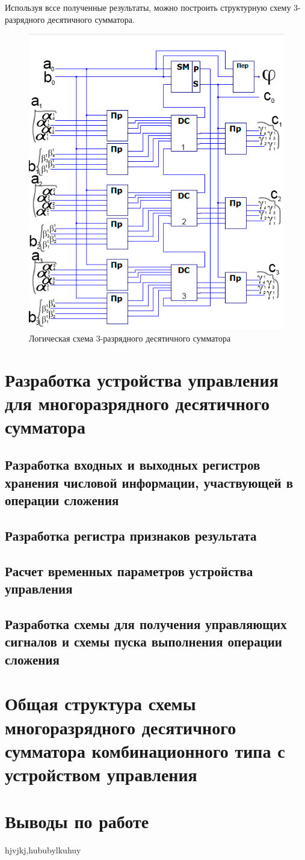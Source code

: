 \documentclass[a4paper,14pt]{article}
\begin{document}
Используя вссе полученные результаты, можно построить структурную схему 3-разрядного десятичного сумматора.

\begin{figure}[H]
	\centering
	\includegraphics[width=0.6\linewidth]{images/3razrSum}
	\caption{Логическая схема 3-разрядного десятичного сумматора}
	\label{fig:3razrSum}
\end{figure}



\section{Разработка устройства управления для многоразрядного десятичного сумматора}

\subsection{Разработка входных и выходных регистров хранения числовой информации, участвующей в операции сложения}

\subsection{Разработка регистра признаков результата}

\subsection{Расчет временных параметров устройства управления}

\subsection{Разработка схемы для получения управляющих сигналов и схемы пуска выполнения операции сложения}

\section{Общая структура схемы многоразрядного десятичного сумматора комбинационного типа с устройством управления}

\section{Выводы по работе}

hjvjkj,hububylkuhuy
\end{document}
